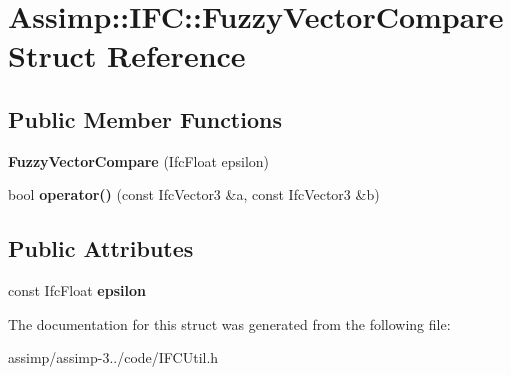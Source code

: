 \hypertarget{struct_assimp_1_1_i_f_c_1_1_fuzzy_vector_compare}{\section{Assimp\+:\+:I\+F\+C\+:\+:Fuzzy\+Vector\+Compare Struct Reference}
\label{struct_assimp_1_1_i_f_c_1_1_fuzzy_vector_compare}
}
\subsection*{Public Member Functions}
\begin{DoxyCompactItemize}
\item 
\hypertarget{struct_assimp_1_1_i_f_c_1_1_fuzzy_vector_compare_adfcb782d619a35dcec5b90ed6bcd3c96}{{\bfseries Fuzzy\+Vector\+Compare} (Ifc\+Float epsilon)}\label{struct_assimp_1_1_i_f_c_1_1_fuzzy_vector_compare_adfcb782d619a35dcec5b90ed6bcd3c96}

\item 
\hypertarget{struct_assimp_1_1_i_f_c_1_1_fuzzy_vector_compare_aecc6e3f0a68550278e389106fd7670c5}{bool {\bfseries operator()} (const Ifc\+Vector3 \&a, const Ifc\+Vector3 \&b)}\label{struct_assimp_1_1_i_f_c_1_1_fuzzy_vector_compare_aecc6e3f0a68550278e389106fd7670c5}

\end{DoxyCompactItemize}
\subsection*{Public Attributes}
\begin{DoxyCompactItemize}
\item 
\hypertarget{struct_assimp_1_1_i_f_c_1_1_fuzzy_vector_compare_a74bf6cb85df8bb4bd3c529de70c1ee58}{const Ifc\+Float {\bfseries epsilon}}\label{struct_assimp_1_1_i_f_c_1_1_fuzzy_vector_compare_a74bf6cb85df8bb4bd3c529de70c1ee58}

\end{DoxyCompactItemize}


The documentation for this struct was generated from the following file\+:\begin{DoxyCompactItemize}
\item 
assimp/assimp-\/3../code/I\+F\+C\+Util.\+h\end{DoxyCompactItemize}
